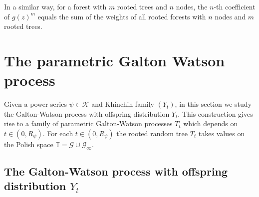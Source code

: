 \documentclass[11pt,a4paper,leqno]{amsart}
\theoremstyle{plain}
\theoremstyle{definition}
\numberwithin{equation}{section}
\def\K{\mathcal{K}}
\begin{document}
	In a similar way, for a forest with \(m\) rooted trees and \(n\) nodes, the $n$-th coefficient of \(g(z)^m\) equals the sum of the weights of all rooted forests with \(n\) nodes and \(m\) rooted trees.
	
	\section{The parametric Galton Watson process}
	
	Given a power series $\psi \in \K$ and Khinchin family $(Y_t)$, in this section we study the Galton-Watson process with offspring distribution $Y_t$. This construction gives rise to a family of parametric Galton-Watson processes $T_t$ which depends on $t \in (0,R_{\psi})$. For each $t \in (0,R_{\psi})$ the rooted random tree $T_t$ takes values on the Polish space $\mathbb{T} = \mathcal{G} \cup \mathcal{G}_{\infty}$.
	
	\subsection{The Galton-Watson process with offspring distribution $Y_t$}
	
\end{document}
